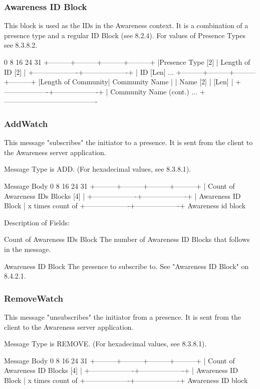 \documentclass[titlepage,oneside]{book}
\begin{document}
\subsubsection{Awareness ID Block}

This block is used as the IDs in the Awareness context. It is a 
combination of a presence type and a regular ID Block (see 
8.2.4). For values of Presence Types see 
8.3.8.2.

0         8         16        24      31
+---------+---------+---------+---------+
|Presence Type [2]  | Length of ID [2]  |
+-------------------+-------------------+
|              ID [Len] ...
+---------+---------+---------+---------+
|Length of Community| Community Name    |
|   Name [2]        |      [Len]        |
+-------------------+-------------------+
|   Community Name (cont.) ...
+----------------------------------------

\subsubsection{AddWatch}

This message "subscribes" the initiator to a presence. It is sent
from the client to the Awareness server application.

Message Type is ADD.
  (For hexadecimal values, see 8.3.8.1).

Message Body
0         8         16        24      31
+---------+---------+---------+---------+
| Count of Awareness IDs Blocks [4]     |
+-------------------+-------------------+
| Awareness ID Block                    | x times count of
+-------------------+-------------------+   Awareness id block

Description of Fields:

Count of Awareness IDs Block
  The number of Awareness ID Blocks that follows in the message.

Awareness ID Block
  The presence to subscribe to. See "Awareness ID Block" on
8.4.2.1.

\subsubsection{RemoveWatch}

This message "unsubscribes" the initiator from a presence. It is sent 
from the client to the Awareness server application.

Message Type is REMOVE.
  (For hexadecimal values, see 8.3.8.1).

Message Body
0         8         16        24      31
+---------+---------+---------+---------+
| Count of Awareness ID Blocks [4]      |
+-------------------+-------------------+
| Awareness ID Block                    | x times count of
+-------------------+-------------------+   Awareness ID block
\end{document}
